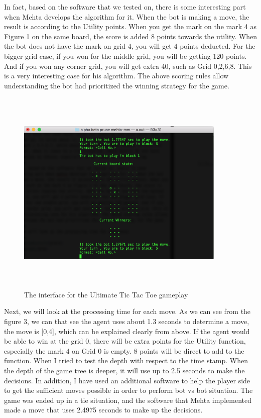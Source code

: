 \documentclass[12pt]{article}
\begin{document}
In fact, based on the software that we tested on, there is some interesting part when Mehta develops the algorithm for it. When the bot is making a move, the result is according to the Utility points. When you get the mark on the mark 4 as Figure 1 on the same board, the score is added 8 points towards the utility. When the bot does not have the mark on grid 4, you will get 4 points deducted. For the bigger grid case, if you won for the middle grid, you will be getting 120 points. And if you won any corner grid, you will get extra 40, such as Grid 0,2,6,8. This is a very interesting case for his algorithm. The above scoring rules allow understanding the bot had prioritized the winning strategy for the game.
\begin{figure}
\begin{center}
\includegraphics[width=10cm,height=10cm]{ScreenShot.png}
\caption{The interface for the Ultimate Tic Tac Toe gameplay}
\end{center}
\end{figure}
\newline

Next, we will look at the processing time for each move. As we can see from the figure 3, we can that see the agent uses about 1.3 seconds to determine a move, the move is [0,4], which can be explained clearly from above. If the agent would be able to win at the grid 0, there will be extra points for the Utility function, especially the mark 4 on Grid 0 is empty. 8 points will be direct to add to the function. When I tried to test the depth with respect to the time stamp. When the depth of the game tree is deeper, it will use up to 2.5 seconds to make the decisions. In addition, I have used an additional software to help the player side to get the sufficient moves possible in order to perform bot vs bot situation. The game was ended up in a tie situation, and the software that Mehta implemented made a move that uses 2.4975 seconds to make up the decisions.
\end{document}
